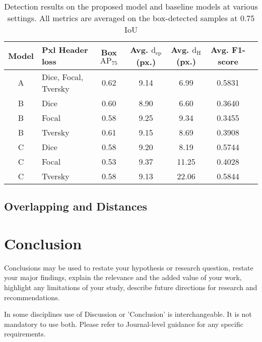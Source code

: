 \documentclass[default,pdflatex,iicol]{sn-jnl}%
\begin{document}
\begin{table*}[]
\centering
\caption{Detection results on the proposed model and baseline models at various settings. All metrics are averaged on the box-detected samples at 0.75 IoU}
\label{tab-results-ap75}
\begin{minipage}{\linewidth}
\begin{center}
\begin{tabular}{clccccc}
Model & Pxl Header loss & Box $\mathrm{AP_{75}}$ & Avg. $\mathrm{d_{ep}}$(px.)	& Avg. $\mathrm{d_{H}}$(px.)	& Avg. F1-score	\\ \midrule
A 	& Dice, Focal, Tversky 	& 0.62 & 9.14 	& 6.99 & 0.5831 \\ \midrule
B	& Dice		& 0.60		&	8.90	&	6.60	& 0.3640	\\
B	& Focal		& 0.58 		&	9.25	&	9.34	&	0.3455	\\ 
B	& Tversky	& 0.61 		&	9.15	&  8.69	&	0.3908   \\ \midrule
C 	& Dice		& 0.58		&	9.20	&	8.19	&	0.5744	\\
C 	& Focal		& 0.53		&	9.37	&	11.25	&	0.4028	\\
C 	& Tversky	& 0.58		&	9.13	&	22.06	&	0.5844	\\ 
\bottomrule
\end{tabular}%
\end{center}
\end{minipage}
\end{table*}

\subsection{Overlapping and Distances}

\section{Conclusion}

Conclusions may be used to restate your hypothesis or research question, restate your major findings, explain the relevance and the added value of your work, highlight any limitations of your study, describe future directions for research and recommendations. 

In some disciplines use of Discussion or 'Conclusion' is interchangeable. It is not mandatory to use both. Please refer to Journal-level guidance for any specific requirements. 

\backmatter

\end{document}
